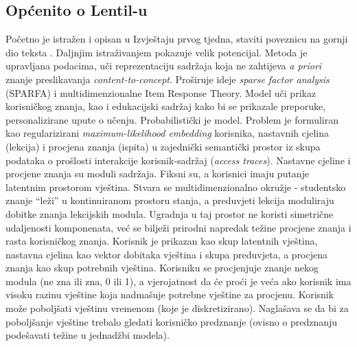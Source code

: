 \documentclass[times, utf8,projekt]{fer}
\begin{document}
\subsection{Općenito o Lentil-u}
Početno je istražen i opisan u {\color{red}Izvještaju prvog tjedna, staviti poveznicu na gornji dio teksta} \citep{6}. Daljnjim istraživanjem pokazuje velik potencijal. Metoda je upravljana podacima, uči reprezentaciju sadržaja koja ne zahtijeva \textit{a priori} znanje preslikavanja \textit{content-to-concept}. Proširuje ideje \textit{sparse factor analysis} (SPARFA) i multidimenzionalne Item Response Theory.\newline
Model uči prikaz korisničkog znanja, kao i edukacijski sadržaj kako bi se prikazale preporuke, personalizirane upute o učenju. Probabilistički je model. Problem je formuliran kao regularizirani \textit{maximum-likelihood embedding} korisnika, nastavnih cjelina (lekcija) i procjena znanja (ispita) u zajednički semantički prostor iz skupa podataka o prošlosti interakcije korisnik-sadržaj (\textit{access traces}). Nastavne cjeline i procjene znanja su moduli sadržaja. Fiksni su, a korisnici imaju putanje latentnim prostorom vještina. Stvara se multidimenzionalno okružje - studentsko znanje “leži” u kontinuiranom prostoru stanja, a preduvjeti lekcija moduliraju dobitke znanja lekcijskih modula. Ugradnja u taj prostor ne koristi simetrične udaljenosti komponenata, već se bilježi prirodni napredak težine procjene znanja i rasta korisničkog znanja.\newline
Korisnik je prikazan kao skup latentnih vještina, nastavna cjelina kao vektor dobitaka vještina i skupa preduvjeta, a procjena znanja kao skup potrebnih vještina. Korisniku se procjenjuje znanje nekog modula (ne zna ili zna, 0 ili 1), a vjerojatnost da će proći je veća ako korisnik ima visoku razinu vještine koja nadmašuje potrebne vještine za procjenu. Korisnik može poboljšati vještinu vremenom (koje je diskretizirano). Naglašava se da bi za poboljšanje vještine trebalo gledati korisničko predznanje (ovisno o predznanju podešavati težine u jednadžbi modela). 
\end{document}
